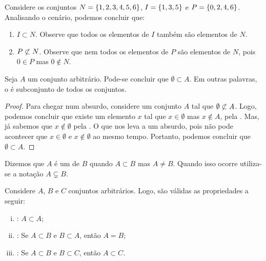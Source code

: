 \begin{example}
Considere os conjuntos $N = \left\{ 1, 2, 3, 4, 5, 6\right\}$, $I = \left\{ 1, 3, 5\right\}$ e $P = \left\{ 0, 2, 4, 6\right\}$.
Analisando o cenário, podemos concluir que:
	\begin{enumerate}
		\item $I \subset N$. Observe que todos os elementos de $I$ também são elementos de $N$.
		\item $P \not\subset N$. Observe que nem todos os elementos de $P$ são elementos de $N$, pois $0 \in P$ mas $0 \notin N$.
	\end{enumerate}
\end{example}

\begin{proposition}
	\label{prop:emptyset1}
Seja $A$ um conjunto arbitrário. Pode-se concluir que $\emptyset \subset A$.
Em outras palavras, o  é subconjunto de todos os conjuntos.
\end{proposition}

\begin{proof}
Para chegar num absurdo, considere um conjunto $A$ tal que $\emptyset \not\subset A$.
Logo, podemos concluir que existe um elemento $x$ tal que $x \in \emptyset$ mas $x \notin A$, pela .
Mas, já sabemos que $x \notin \emptyset$ pela .
O que nos leva a um absurdo, pois não pode acontecer que $x \in \emptyset$ e $x \notin \emptyset$ ao mesmo tempo.
Portanto, podemos concluir que $\emptyset \subset A$.
\end{proof}

\begin{definition}
Dizemos que $A$ é um  de $B$ quando $A \subset B$ mas $A \neq B$. Quando isso ocorre utiliza-se a notação $A \subsetneq B$.
\end{definition}

\begin{proposition}
Considere $A$, $B$ e $C$ conjuntos arbitrários. Logo, são válidas as propriedades a seguir:

\begin{enumerate}[i)]
\item
	\label{inclusao:reflexividade}
	: $A \subset A$;
\item
	\label{inclusao:antissimetria}
	: Se $A \subset B$ e $B \subset A$, então $A = B$;
\item
	\label{inclusao:transitividade}
	: Se $A \subset B$ e $B \subset C$, então $A \subset C$.
\end{enumerate}
\end{proposition}

